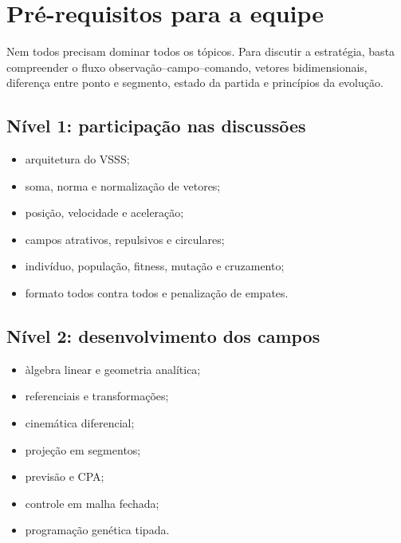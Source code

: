 \documentclass[12pt,a4paper]{article}
\begin{document}
\section{Pr\'e-requisitos para a equipe}

Nem todos precisam dominar todos os t\'opicos. Para discutir a estrat\'egia, basta compreender o fluxo observa\c{c}\~ao--campo--comando, vetores bidimensionais, diferen\c{c}a entre ponto e segmento, estado da partida e princ\'ipios da evolu\c{c}\~ao.

\subsection{N\'ivel 1: participa\c{c}\~ao nas discuss\~oes}

\begin{itemize}
  \item arquitetura do VSSS;
  \item soma, norma e normaliza\c{c}\~ao de vetores;
  \item posi\c{c}\~ao, velocidade e acelera\c{c}\~ao;
  \item campos atrativos, repulsivos e circulares;
  \item indiv\'iduo, popula\c{c}\~ao, fitness, muta\c{c}\~ao e cruzamento;
  \item formato todos contra todos e penaliza\c{c}\~ao de empates.
\end{itemize}

\subsection{N\'ivel 2: desenvolvimento dos campos}

\begin{itemize}
  \item \`algebra linear e geometria anal\'itica;
  \item referenciais e transforma\c{c}\~oes;
  \item cinem\'atica diferencial;
  \item proje\c{c}\~ao em segmentos;
  \item previs\~ao e CPA;
  \item controle em malha fechada;
  \item programa\c{c}\~ao gen\'etica tipada.
\end{itemize}
\end{document}
